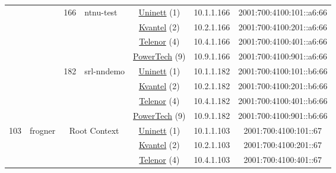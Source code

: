 \begin{small}
\begin{center}
\begin{longtable}{|c|c|c|c|c|c|c|c|}
  &  & \multirow{4}{*}{\tiny{166}} & \multicolumn{1}{|l|}{\multirow{4}{*}{\tiny{ntnu-test}}} & \multicolumn{2}{|c|}{\tiny{\href{https://www.uninett.no}{Uninett} (1)}} & \tiny{10.1.1.166} & \tiny{2001:700:4100:101::a6:66} \\* \cline{5-5}\cline{6-6}\cline{7-7}\cline{8-8}
  &  &  &  & \multicolumn{2}{|c|}{\tiny{\href{http://kvantel.no}{Kvantel} (2)}} & \tiny{10.2.1.166} & \tiny{2001:700:4100:201::a6:66} \\* \cline{5-5}\cline{6-6}\cline{7-7}\cline{8-8}
  &  &  &  & \multicolumn{2}{|c|}{\tiny{\href{https://www.telenor.no}{Telenor} (4)}} & \tiny{10.4.1.166} & \tiny{2001:700:4100:401::a6:66} \\* \cline{5-5}\cline{6-6}\cline{7-7}\cline{8-8}
  &  &  &  & \multicolumn{2}{|c|}{\tiny{\href{http://www.powertech.no}{PowerTech} (9)}} & \tiny{10.9.1.166} & \tiny{2001:700:4100:901::a6:66} \\* \cline{3-3}\cline{4-4}\cline{5-5}\cline{6-6}\cline{7-7}\cline{8-8}
  &  & \multirow{4}{*}{\tiny{182}} & \multicolumn{1}{|l|}{\multirow{4}{*}{\tiny{srl-nndemo}}} & \multicolumn{2}{|c|}{\tiny{\href{https://www.uninett.no}{Uninett} (1)}} & \tiny{10.1.1.182} & \tiny{2001:700:4100:101::b6:66} \\* \cline{5-5}\cline{6-6}\cline{7-7}\cline{8-8}
  &  &  &  & \multicolumn{2}{|c|}{\tiny{\href{http://kvantel.no}{Kvantel} (2)}} & \tiny{10.2.1.182} & \tiny{2001:700:4100:201::b6:66} \\* \cline{5-5}\cline{6-6}\cline{7-7}\cline{8-8}
  &  &  &  & \multicolumn{2}{|c|}{\tiny{\href{https://www.telenor.no}{Telenor} (4)}} & \tiny{10.4.1.182} & \tiny{2001:700:4100:401::b6:66} \\* \cline{5-5}\cline{6-6}\cline{7-7}\cline{8-8}
  &  &  &  & \multicolumn{2}{|c|}{\tiny{\href{http://www.powertech.no}{PowerTech} (9)}} & \tiny{10.9.1.182} & \tiny{2001:700:4100:901::b6:66} \\ \hline
 \multirow{20}{*}{\tiny{103}} & \multicolumn{1}{|l|}{\multirow{20}{*}{\tiny{frogner}}} & \multicolumn{2}{|c|}{\multirow{4}{*}{\tiny{Root Context}}} & \multicolumn{2}{|c|}{\tiny{\href{https://www.uninett.no}{Uninett} (1)}} & \tiny{10.1.1.103} & \tiny{2001:700:4100:101::67} \\* \cline{5-5}\cline{6-6}\cline{7-7}\cline{8-8}
  &  & \multicolumn{2}{|c|}{} & \multicolumn{2}{|c|}{\tiny{\href{http://kvantel.no}{Kvantel} (2)}} & \tiny{10.2.1.103} & \tiny{2001:700:4100:201::67} \\* \cline{5-5}\cline{6-6}\cline{7-7}\cline{8-8}
  &  & \multicolumn{2}{|c|}{} & \multicolumn{2}{|c|}{\tiny{\href{https://www.telenor.no}{Telenor} (4)}} & \tiny{10.4.1.103} & \tiny{2001:700:4100:401::67} \\* \cline{5-5}\cline{6-6}\cline{7-7}\cline{8-8}

\end{longtable}
\end{center}
\end{small}
